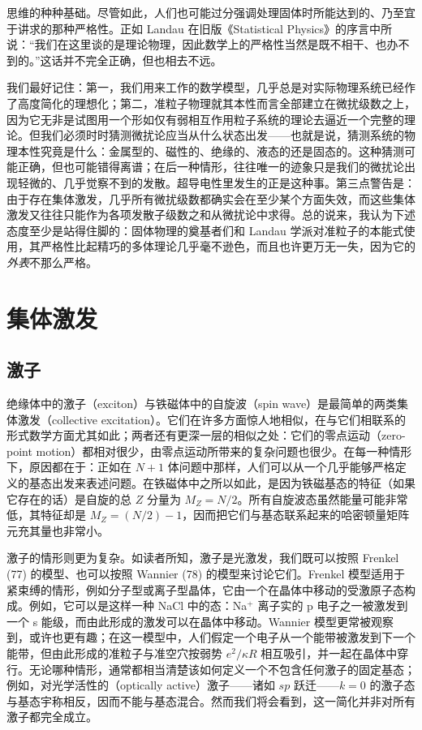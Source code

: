 思维的种种基础。尽管如此，人们也可能过分强调处理固体时所能达到的、乃至宜于讲求的那种严格性。正如 Landau 在旧版《Statistical Physics》的序言中所说：“我们在这里谈的是理论物理，因此数学上的严格性当然是既不相干、也办不到的。”这话并不完全正确，但也相去不远。

我们最好记住：第一，我们用来工作的数学模型，几乎总是对实际物理系统已经作了高度简化的理想化；第二，准粒子物理就其本性而言全部建立在微扰级数之上，因为它无非是试图用一个形如仅有弱相互作用粒子系统的理论去逼近一个完整的理论。但我们必须时时猜测微扰论应当从什么状态出发——也就是说，猜测系统的物理本性究竟是什么：金属型的、磁性的、绝缘的、液态的还是固态的。这种猜测可能正确，但也可能错得离谱；在后一种情形，往往唯一的迹象只是我们的微扰论出现轻微的、几乎觉察不到的发散。超导电性里发生的正是这种事。第三点警告是：由于存在集体激发，几乎所有微扰级数都确实会在至少某个方面失效，而这些集体激发又往往只能作为各项发散子级数之和从微扰论中求得。总的说来，我认为下述态度至少是站得住脚的：固体物理的奠基者们和 Landau 学派对准粒子的本能式使用，其严格性比起精巧的多体理论几乎毫不逊色，而且也许更万无一失，因为它的\emph{外表}不那么严格。

\section{集体激发}

\subsection{激子}

绝缘体中的激子（exciton）与铁磁体中的自旋波（spin wave）是最简单的两类集体激发（collective excitation）。它们在许多方面惊人地相似，在与它们相联系的形式数学方面尤其如此；两者还有更深一层的相似之处：它们的零点运动（zero-point motion）都相对很少，由零点运动所带来的复杂问题也很少。在每一种情形下，原因都在于：正如在 $N+1$ 体问题中那样，人们可以从一个几乎能够严格定义的基态出发来表述问题。在铁磁体中之所以如此，是因为铁磁基态的特征（如果它存在的话）是自旋的总 $Z$ 分量为 $M_Z = N/2$。所有自旋波态虽然能量可能非常低，其特征却是 $M_Z = (N/2) - 1$，因而把它们与基态联系起来的哈密顿量矩阵元充其量也非常小。

激子的情形则更为复杂。如读者所知，激子是光激发，我们既可以按照 Frenkel (77) 的模型、也可以按照 Wannier (78) 的模型来讨论它们。Frenkel 模型适用于紧束缚的情形，例如分子型或离子型晶体，它由一个在晶体中移动的受激原子态构成。例如，它可以是这样一种 NaCl 中的态：Na$^+$ 离子实的 p 电子之一被激发到一个 s 能级，而由此形成的激发可以在晶体中移动。Wannier 模型更常被观察到，或许也更有趣；在这一模型中，人们假定一个电子从一个能带被激发到下一个能带，但由此形成的准粒子与准空穴按弱势 $e^2/\kappa R$ 相互吸引，并一起在晶体中穿行。无论哪种情形，通常都相当清楚该如何定义一个不包含任何激子的固定基态；例如，对光学活性的（optically active）激子——诸如 $sp$ 跃迁——$k=0$ 的激子态与基态宇称相反，因而不能与基态混合。然而我们将会看到，这一简化并非对所有激子都完全成立。

